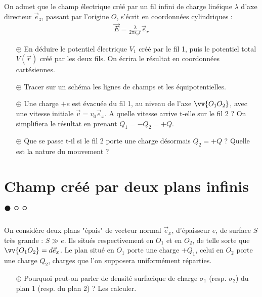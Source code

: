 \documentclass{report}
\begin{document}
On admet que le champ électrique créé par un fil infini de charge linéique $\lambda$ d'axe directeur $\vec{e}_z$, passant par l'origine $O$, s'écrit en coordonnées cylindriques :
\begin{align*}
	\vec{E}=\frac{\lambda}{2\pi\varepsilon_0 r}\vec{e}_r
\end{align*}

\begin{itemize}

	\item[$\oplus$] En déduire le potentiel électrique $V_1$ créé par le fil 1, puis le potentiel total $V(\vec{r})$ créé par les deux fils. On écrira le résultat en coordonnées cartésiennes.
	
	\item[$\oplus$] Tracer sur un schéma les lignes de champs et les équipotentielles. 
	
	\item[$\oplus$] Une charge $+e$ est évacuée du fil 1, au niveau de l'axe $\vv{O_1O_2}$, avec une vitesse initiale $\vec{v}=v_0\vec{e}_x$. A quelle vitesse arrive t-elle sur le fil 2 ? On simplifiera le résultat en prenant $Q_1=-Q_2=+Q$.
	
	\item[$\oplus$] Que se passe t-il si le fil 2 porte une charge désormais $Q_2=+Q$ ? Quelle est la nature du mouvement ? 

\end{itemize}

\newpage

\section*{Champ créé par deux plans infinis $\bullet\circ\circ$}

On considère deux plans "épais" de vecteur normal $\vec{e}_x$, d'épaisseur $e$, de surface $S$ très grande : $S\gg e$. Ils situés respectivement en $O_1$ et en $O_2$, de telle sorte que $\vv{O_1O_2}=d\vec{e}_x$. Le plan situé en $O_1$ porte une charge $+Q_1$, celui en $O_2$ porte une charge $Q_2$, charges que l'on supposera uniformément réparties. 

\begin{itemize}

	\item[$\oplus$] Pourquoi peut-on parler de densité surfacique de charge $\sigma_1$ (resp. $\sigma_2$) du plan 1 (resp. du plan 2) ? Les calculer.

\end{itemize}
\end{document}
